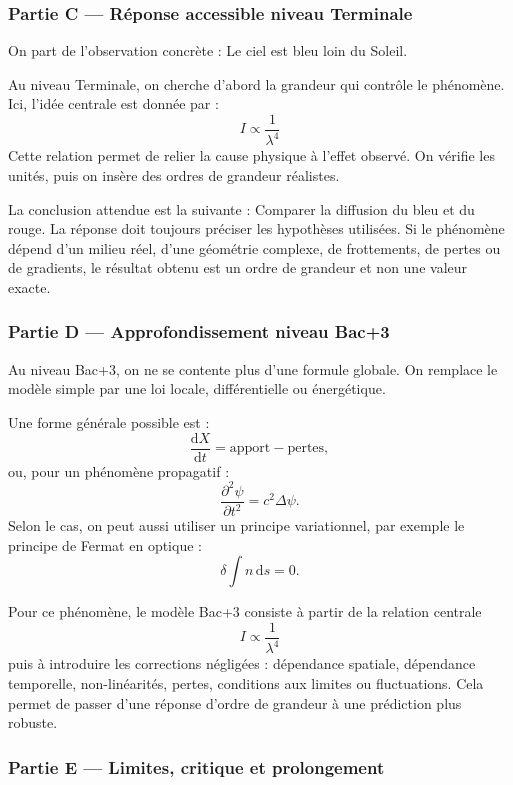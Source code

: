 \documentclass[11pt,a4paper]{article}
\begin{document}
\subsubsection*{Partie C — Réponse accessible niveau Terminale}

\begin{corrigebox}
On part de l'observation concrète : Le ciel est bleu loin du Soleil.

Au niveau Terminale, on cherche d'abord la grandeur qui contrôle le phénomène. Ici, l'idée centrale est donnée par :
\[
I\propto\frac1{\lambda^4}
\]
Cette relation permet de relier la cause physique à l'effet observé. On vérifie les unités, puis on insère des ordres de grandeur réalistes.

La conclusion attendue est la suivante : Comparer la diffusion du bleu et du rouge. La réponse doit toujours préciser les hypothèses utilisées. Si le phénomène dépend d'un milieu réel, d'une géométrie complexe, de frottements, de pertes ou de gradients, le résultat obtenu est un ordre de grandeur et non une valeur exacte.
\end{corrigebox}

\subsubsection*{Partie D — Approfondissement niveau Bac+3}

\begin{approfondissementbox}
Au niveau Bac+3, on ne se contente plus d'une formule globale. On remplace le modèle simple par une loi locale, différentielle ou énergétique.

Une forme générale possible est :
\[
\frac{\mathrm d X}{\mathrm dt}=\text{apport}-\text{pertes},
\]
ou, pour un phénomène propagatif :
\[
\frac{\partial^2 \psi}{\partial t^2}=c^2\Delta\psi.
\]
Selon le cas, on peut aussi utiliser un principe variationnel, par exemple le principe de Fermat en optique :
\[
\delta \int n\,\mathrm ds=0.
\]

Pour ce phénomène, le modèle Bac+3 consiste à partir de la relation centrale
\[
I\propto\frac1{\lambda^4}
\]
puis à introduire les corrections négligées : dépendance spatiale, dépendance temporelle, non-linéarités, pertes, conditions aux limites ou fluctuations. Cela permet de passer d'une réponse d'ordre de grandeur à une prédiction plus robuste.
\end{approfondissementbox}

\subsubsection*{Partie E — Limites, critique et prolongement}
\end{document}
